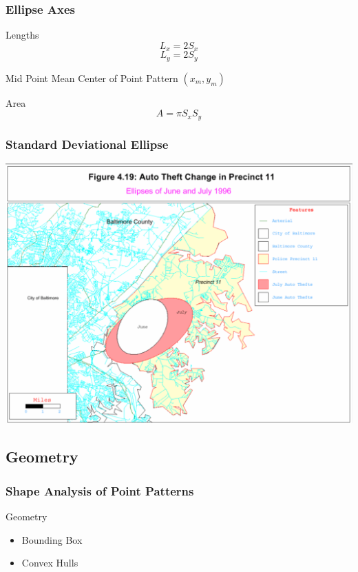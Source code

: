 \documentclass[nototal]{beamer}
\begin{document}
  \begin{frame}
    \frametitle{Ellipse Axes}
    \begin{block}{Lengths}
      \begin{equation}
	L_x = 2 S_x
      \end{equation}
      \begin{equation}
	L_y = 2 S_y
      \end{equation}
     \end{block}
     \begin{block}{Mid Point}
	Mean Center of Point Pattern $(x_m,y_m)$
     \end{block}
     \begin{block}{Area}
       \begin{equation}
       A = \pi S_x S_y
       \end{equation}
     \end{block}


   \end{frame}

\begin{frame}
   \frametitle{Standard Deviational Ellipse}
   \begin{center}
     \includegraphics[width=.85\linewidth]{ellipse}
   \end{center}
 \end{frame}



\subsection{Geometry}
\begin{frame}
  \frametitle{Shape Analysis of Point Patterns}
  \begin{block}{Geometry}
    \begin{itemize}
      \item Bounding Box
      \item Convex Hulls
    \end{itemize}
   \end{block}
 \end{frame}
\end{document}
